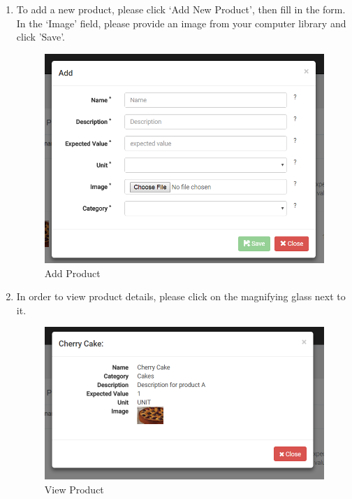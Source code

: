 \documentclass[a4paper,11pt,twoside]{report}
\theoremstyle{definition}
\begin{document}
\begin{enumerate}
\item To add a new product, please click ‘Add New Product’, then fill in the form. In the ‘Image’ field, please provide an image from your computer library and click 'Save'.
\begin{figure}[h!]
\begin{center}
\includegraphics[width=\textwidth]{AS/product/4}
\end{center}
\caption{Add Product}
\end{figure}
\thispagestyle{empty}

\item In order to view product details, please click on the magnifying glass next to it.

\begin{figure}[h!]
\begin{center}
\includegraphics[width=\textwidth]{AS/product/5}
\end{center}
\caption{View Product}
\end{figure}
\thispagestyle{empty}



\end{enumerate}
\end{document}
